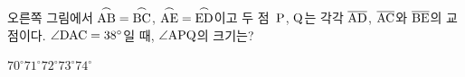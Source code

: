 \noindent\begin{minipage}[t]{0.58\linewidth}\vspace{0pt}\raggedright 오른쪽 그림에서 $\overset{\frown}{\mathrm{AB}}=\overset{\frown}{\mathrm{BC}}$, $\overset{\frown}{\mathrm{AE}}=\overset{\frown}{\mathrm{ED}}$이고 두 점~$\mathrm{P}$, $\mathrm{Q}$는 각각 $\overline{\mathrm{AD}}$, $\overline{\mathrm{AC}}$와 $\overline{\mathrm{BE}}$의 교점이다. $\angle\mathrm{DAC}=38^\circ$일 때, $\angle\mathrm{APQ}$의 크기는?\end{minipage}\hfill\begin{minipage}[t]{0.4\linewidth}\vspace{0pt}\centering \resizebox{\ifdim\width>\linewidth\linewidth\else\width\fi}{!}{}\end{minipage}\par
\begin{choices32}{$70^\circ$}{$71^\circ$}{$72^\circ$}{$73^\circ$}{$74^\circ$}\end{choices32}
